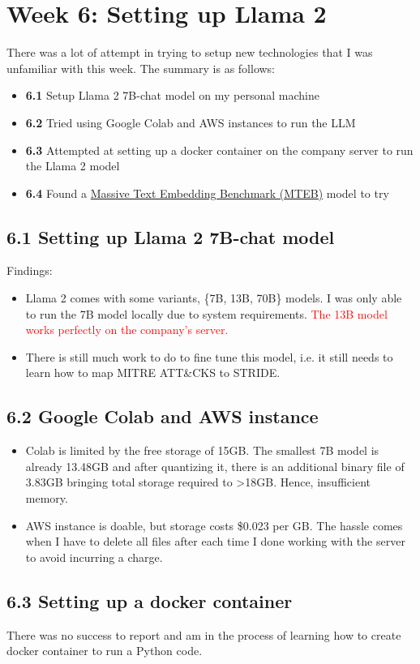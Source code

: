 \section*{Week 6: Setting up Llama 2}

There was a lot of attempt in trying to setup new technologies that I was unfamiliar with this week. The summary is as follows:
\begin{itemize}[topsep=0pt]
    \item \textbf{6.1} Setup Llama 2 7B-chat model on my personal machine
    \item \textbf{6.2} Tried using Google Colab and AWS instances to run the LLM
    \item \textbf{6.3} Attempted at setting up a docker container on the company server to run the Llama 2 model
    \item \textbf{6.4} Found a \href{https://arxiv.org/pdf/2210.07316.pdf}{Massive Text Embedding Benchmark (MTEB)} model to try
\end{itemize}

\subsection*{6.1 Setting up Llama 2 7B-chat model}
Findings:
\begin{itemize}[topsep=0pt]
    \item Llama 2 comes with some variants, \{7B, 13B, 70B\} models. I was only able to run the 7B model locally due to system requirements. \textcolor{red}{The 13B model works perfectly on the company's server.}
    \item There is still much work to do to fine tune this model, i.e. it still needs to learn how to map MITRE ATT\&CKS to STRIDE.
\end{itemize}


\subsection*{6.2 Google Colab and AWS instance}
\begin{itemize}[topsep=0pt]
    \item Colab is limited by the free storage of 15GB. The smallest 7B model is already 13.48GB and after quantizing it, there is an additional binary file of 3.83GB bringing total storage required to >18GB. Hence, insufficient memory.
    \item AWS instance is doable, but storage costs \$0.023 per GB. The hassle comes when I have to delete all files after each time I done working with the server to avoid incurring a charge.
\end{itemize}

\subsection*{6.3 Setting up a docker container}
There was no success to report and am in the process of learning how to create docker container to run a Python code.